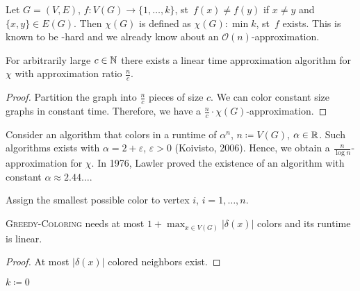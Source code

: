 \documentclass[../skript.tex]{subfiles}
\begin{document}
Let $G = (V, E)$, $f : V(G) \to \{ 1, \ldots, k\}$, \ac{st}\ $f(x) \neq f(y)$ if $x \neq y$ and $\{ x, y \} \in E(G)$. Then $\chi(G)$ is defined as $\chi(G) : \min k$, \ac{st}\ $f$ exists. This is known to be \NP-hard and we already know about an $\mathcal{O}(n)$-approximation.
\begin{proposition} %
\label{prop:32}
For arbitrarily large $c \in \mathbb{N}$ there exists a linear time approximation algorithm for $\chi$ with approximation ratio $\frac{n}{c}$.
\end{proposition}
\begin{proof}
Partition the graph into $\frac{n}{c}$ pieces of size $c$. We can color constant size graphs in constant time. Therefore, we have a $\frac{n}{c} \cdot \chi(G)$-approximation.
\end{proof}
Consider an algorithm that colors in a runtime of $\alpha^n$, $n \coloneqq V(G)$, $\alpha \in \mathbb{R}$. Such algorithms exists with $\alpha = 2 + \varepsilon$, $\varepsilon > 0$ (Koivisto, 2006). Hence, we obtain a $\frac{n}{\log n}$-approximation for $\chi$. In 1976, Lawler proved the existence of an algorithm with constant $\alpha \approx 2.44\ldots$.
\begin{algorithmbox}
\end{algorithmbox}
\vspace{-7pt}
\begin{algorithm}[H]
Assign the smallest possible color to vertex $i$, $i = 1, \ldots, n$.\;
\end{algorithm}
\vspace{-7pt}
\EndAlgorithmLine
\begin{theorem} %
\textsc{Greedy-Coloring} needs at most $1 + \max_{x \in V(G)} |\delta(x)|$ colors and its runtime is linear.
\end{theorem}
\begin{proof}
At most $|\delta(x)|$ colored neighbors exist.
\end{proof}
\begin{algorithmbox}
\end{algorithmbox}
\vspace{-7pt}
\begin{algorithm}[H]
$k \coloneqq 0$\;
\end{algorithm}
\vspace{-7pt}
\end{document}
